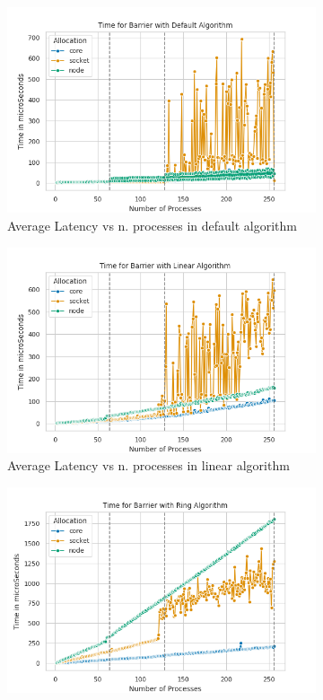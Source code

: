 \documentclass{article}
\begin{document}
	\begin{figure}[h]
		\centering
		\begin{subfigure}{0.45\textwidth}
			\centering
			\includegraphics[width=0.7\linewidth]{../exercise1/plots/barrier_default}
			\caption{Average Latency vs n. processes in default algorithm}
			\label{fig:barrierdefault}
		\end{subfigure}
		\begin{subfigure}{0.45\textwidth}
			\centering
			\includegraphics[width=0.7\linewidth]{../exercise1/plots/barrier_linear}
			\caption{Average Latency vs n. processes in linear algorithm}
			\label{fig:barrierlinear}
		\end{subfigure}
		\begin{subfigure}{0.45\textwidth}
			\centering
			\includegraphics[width=0.7\linewidth]{../exercise1/plots/barrier_ring}

\end{subfigure}
\end{figure}
\end{document}
